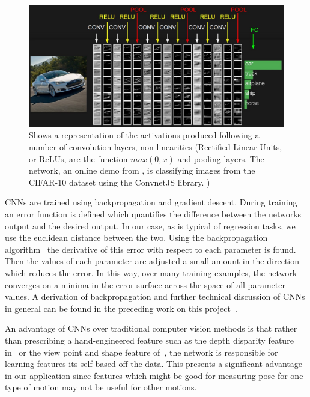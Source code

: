 \documentclass[11pt]{article} %
\begin{document}
\begin{figure}
\includegraphics*[width=1\linewidth,clip]{convnet}
\caption{Shows a representation of the activations produced following a number of convolution layers, non-linearities (Rectified Linear Units, or ReLUs, are the function $max(0,x)$ and pooling layers. The network, an online demo from \cite{KarLects}, is classifying images from the CIFAR-10 dataset using the ConvnetJS library\protect\footnotemark. ) \label{fig:convnet}  }
\end{figure}

CNNs are trained using backpropagation and gradient descent. During training an error function is defined which quantifies the difference between the networks output and the desired output. In our case, as is typical of regression tasks, we use the euclidean distance between the two. Using the backpropagation algorithm~\cite{Rumelhart1986} the derivative of this error with respect to each parameter is found.  Then the values of each parameter are adjusted a small amount in the direction which reduces the error. In this way, over many training examples, the network converges on a minima in the error surface across the space of all parameter values.  A derivation of backpropagation and further technical discussion of CNNs in general can be found in the preceding work on this project~\cite{Crabbe2015}.

An advantage of CNNs over traditional computer vision methods is that rather than prescribing a hand-engineered feature such as the depth disparity feature in~\cite{Shotton2011} or the view point and shape feature of~\cite{Chan2014}, the network is responsible for learning features its self based off the data. This presents a significant advantage in our application since features which might be good for measuring pose for one type of motion may not be useful for other motions. %
\end{document}
